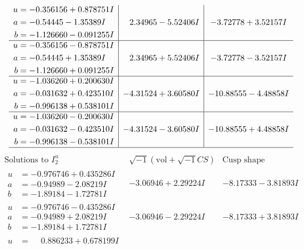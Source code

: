 \documentclass[1p]{elsarticle_modified}
\theoremstyle{definition}
\newcommand{\I}{\sqrt{-1}}
\begin{document}
$$\begin{array}{c|c|c}
\begin{aligned}
u &= -0.356156 + 0.878751 I \\
a &= -0.54445 - 1.35389 I \\
b &= -1.126660 - 0.091255 I\end{aligned}
 & \phantom{-}2.34965 - 5.52406 I & -3.72778 + 3.52157 I \\ \hline\begin{aligned}
u &= -0.356156 - 0.878751 I \\
a &= -0.54445 + 1.35389 I \\
b &= -1.126660 + 0.091255 I\end{aligned}
 & \phantom{-}2.34965 + 5.52406 I & -3.72778 - 3.52157 I \\ \hline\begin{aligned}
u &= -1.036260 + 0.200630 I \\
a &= -0.031632 + 0.423510 I \\
b &= -0.996138 + 0.538101 I\end{aligned}
 & -4.31524 + 3.60580 I & -10.88555 - 4.48858 I \\ \hline\begin{aligned}
u &= -1.036260 - 0.200630 I \\
a &= -0.031632 - 0.423510 I \\
b &= -0.996138 - 0.538101 I\end{aligned}
 & -4.31524 - 3.60580 I & -10.88555 + 4.48858 I\\
 \hline 
 \end{array}$$\newpage$$\begin{array}{c|c|c}  
\text{Solutions to }I^u_{2}& \I (\text{vol} + \sqrt{-1}CS) & \text{Cusp shape}\\
 \hline 
\begin{aligned}
u &= -0.976746 + 0.435286 I \\
a &= -0.94989 - 2.08219 I \\
b &= -1.89184 - 1.72781 I\end{aligned}
 & -3.06946 + 2.29224 I & -8.17333 - 3.81893 I \\ \hline\begin{aligned}
u &= -0.976746 - 0.435286 I \\
a &= -0.94989 + 2.08219 I \\
b &= -1.89184 + 1.72781 I\end{aligned}
 & -3.06946 - 2.29224 I & -8.17333 + 3.81893 I \\ \hline\begin{aligned}
u &= \phantom{-}0.886233 + 0.678199 I \\

\end{aligned}
\end{array}$$
\end{document}
